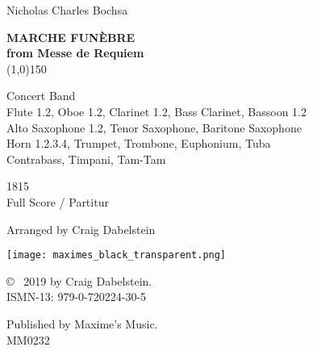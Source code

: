 \documentclass[a4paper, oneside, 12pt]{memoir}
\newlength{\saveparindent}
\begin{document}
 



\Centering
\LARGE {Nicholas Charles Bochsa}\\
\vspace{20mm}

\Huge \textbf {MARCHE FUNÈBRE}\\
\textbf {from Messe de Requiem}\\
\vspace{10mm}
\vspace{10mm}
\line(1,0){150}
\vspace{30mm}

\Large {Concert Band}\\
\vspace{5mm}
\normalsize {Flute 1.2, Oboe 1.2, Clarinet 1.2, Bass Clarinet, Bassoon 1.2}\\
{Alto Saxophone 1.2, Tenor Saxophone, Baritone Saxophone}\\
{Horn 1.2.3.4, Trumpet, Trombone, Euphonium, Tuba}\\
{Contrabass, Timpani, Tam-Tam}\\

\vspace{35mm}

\Large {1815}\\
Full Score / Partitur

\vspace*{\fill}

\large {Arranged by Craig Dabelstein}

\clearpage



\vspace*{\fill}
\begin{center}
	\texttt{[image: maximes\_black\_transparent.png]}
\end{center}
\vfill

\RaggedRight
\setlength{\parindent}{\saveparindent}
\vspace*{\fill}
\tiny \copyright~ 2019 by Craig Dabelstein.\\
\medskip
ISMN-13: 979-0-720224-30-5\\
\medskip


Published by Maxime's Music.\\
\textsc {MM0232}\\
\clearpage
\end{document}
